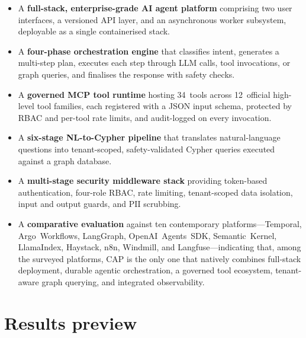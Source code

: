 \documentclass[a4paper,noexaminfo]{sapthesis}
\begin{document}
\begin{itemize}
    \item A \textbf{full-stack, enterprise-grade AI agent platform} comprising
          two user interfaces, a versioned API layer, and an asynchronous
          worker subsystem, deployable as a single containerised stack.

    \item A \textbf{four-phase orchestration engine} that classifies intent,
          generates a multi-step plan, executes each step through LLM
          calls, tool invocations, or graph queries, and finalises the
          response with safety checks.

    \item A \textbf{governed MCP tool runtime} hosting 34~tools across
          12~official high-level tool families, each registered with a JSON
          input schema, protected by RBAC and per-tool rate limits, and
          audit-logged on every invocation.

    \item A \textbf{six-stage NL-to-Cypher pipeline} that translates
          natural-language questions into tenant-scoped, safety-validated
          Cypher queries executed against a graph database.

    \item A \textbf{multi-stage security middleware stack} providing
          token-based authentication, four-role RBAC, rate limiting,
          tenant-scoped data isolation, input and output guards, and PII
          scrubbing.

    \item A \textbf{comparative evaluation} against ten contemporary
          platforms---Temporal, Argo~Workflows, LangGraph,
          OpenAI~Agents~SDK, Semantic~Kernel, LlamaIndex, Haystack, n8n,
          Windmill, and Langfuse---indicating that, among the surveyed
          platforms, CAP is the only one that natively combines full-stack
          deployment, durable agentic orchestration, a governed tool
          ecosystem, tenant-aware graph querying, and integrated
          observability.
\end{itemize}

\section{Results preview}
\label{sec:results-preview}
\end{document}
